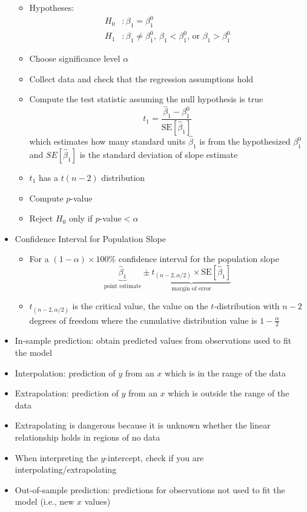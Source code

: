 \documentclass[12pt]{article}
\begin{document}
\begin{itemize}
\begin{itemize}
\item Hypotheses: $$ \begin{aligned} 
H_0 &: \beta_1 = \beta_1^0 \\ H_1 &: \beta_1 \neq \beta_1^0,~ \beta_1 < \beta_1^0 \text{, or } \beta_1 > \beta_1^0 \end{aligned} $$ 
\item Choose significance level $\alpha$ 
\item Collect data and check that the regression assumptions hold 
\item Compute the test statistic assuming the null hypothesis is true 
$$ t_1 = \frac{\hat{\beta}_1 - \beta_1^0}{\text{SE}[\hat{\beta}_1]} $$ which estimates how many standard units $\hat{\beta}_1$ is from the hypothesized $\beta_1^0$ and $SE[\hat{\beta}_1]$ is the standard deviation of slope estimate 
\item $t_1$ has a $t(n-2)$ distribution 
\item Compute $p$-value 
\item Reject $H_0$ only if $p$-value$<\alpha$ 
\end{itemize}
\item Confidence Interval for Population Slope \begin{itemize} 
\item For a $(1-\alpha) \times 100\%$ confidence interval for the population slope
$$ \underbrace{\hat{\beta}_1}_{\text{point estimate}} \pm \underbrace{t_{(n-2, \alpha/2)} \times \text{SE}[\hat{\beta}_1]}_{\text{margin of error}} $$ 
\item $t_{(n-2, \alpha/2)}$ is the critical value, the value on the $t$-distribution with $n-2$ degrees of freedom where the cumulative distribution value is $1 - \frac{\alpha}{2}$ \end{itemize}
\item In-sample prediction: obtain predicted values from observations used to fit the model 
\item Interpolation: prediction of $y$ from an $x$ which is in the range of the data 
\item Extrapolation: prediction of $y$ from an $x$ which is outside the range of the data 
\item Extrapolating is dangerous because it is unknown whether the linear relationship holds in regions of no data 
\item When interpreting the $y$-intercept, check if you are interpolating/extrapolating 
\item Out-of-sample prediction: predictions for observations not used to fit the model (i.e., new $x$ values)

\end{itemize}
\end{document}
